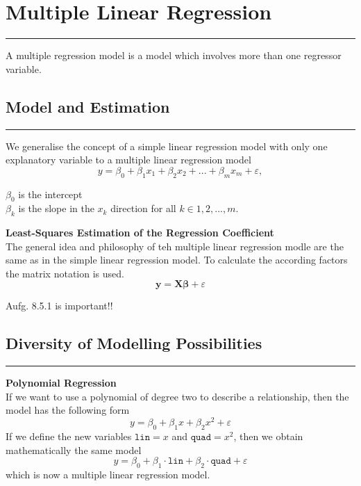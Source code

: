 \section{Multiple Linear Regression}
\noindent\rule[\linienAbstand]{\linewidth}{\linienDickeDick}
A multiple regression model is a model which involves more than one regressor variable.\\

\subsection{Model and Estimation}
\noindent\rule[\linienAbstand]{\linewidth}{\linienDicke}
We generalise the concept of a simple linear regression model with only one explanatory variable to a multiple linear regression model
\begin{equation}
  y = \beta_0 + \beta_1 x_1 + \beta_2 x_2 + ... + \beta_m x_m +\varepsilon,
\end{equation}

$\beta_0$ is the intercept\\
$\beta_k$ is the slope in the $x_k$ direction for all $k \in {1, 2, ..., m}$.


\textbf{Least-Squares Estimation of the Regression Coefficient}\\
The general idea and philosophy of teh multiple linear regression modle are the same as in the simple linear regression model. To calculate the according factors the matrix notation is used.
\begin{equation}
  \mathbf{y} = \mathbf{X} \mathbf{\beta} + \varepsilon
\end{equation}

Aufg. 8.5.1 is important!!

\subsection{Diversity of Modelling Possibilities}
\noindent\rule[\linienAbstand]{\linewidth}{\linienDicke}

\textbf{Polynomial Regression}\\
If we want to use a polynomial of degree two to describe a relationship, then the model has the following form
\begin{equation}
  y = \beta_0 + \beta_1x + \beta_2 x^2 + \varepsilon
\end{equation}
If we define the new variables $\texttt{lin} = x$ and $\texttt{quad} = x^2$, then we obtain mathematically the same model
\begin{equation}
  y = \beta_0 + \beta_1 \cdot \texttt{lin} + \beta_2 \cdot \texttt{quad} + \varepsilon
\end{equation}
which is now a multiple linear regression model.

